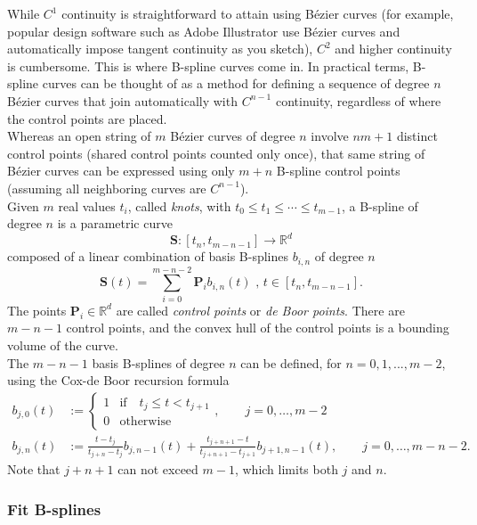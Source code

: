 \documentclass[]{usiinfbachelorproject}
\begin{document}
\noindent While $C^1$ continuity is straightforward to attain using B\'ezier curves (for example, popular design software such as Adobe Illustrator use B\'ezier curves and automatically impose tangent continuity as you sketch), $C^2$ and higher continuity is cumbersome. This is where B-spline curves come in. In practical terms, B-spline curves can be thought of as a method for defining a sequence of degree $n$ B\'ezier curves that join automatically with $C^{n-1}$ continuity, regardless of where the control points are placed.\\
Whereas an open string of $m$ B\'ezier curves of degree $n$ involve $nm + 1$ distinct control points (shared control points counted only once), that same string of B\'ezier curves can be expressed using only $m + n$ B-spline control points (assuming all neighboring curves are $C^{n-1}$).\\
Given $m$ real values  $t_i$, called \emph{knots}, with $t_0 \le t_1 \le \cdots \le t_{m-1} $, a B-spline of degree $n$ is a parametric curve
$$\mathbf{S}:[t_{n}, t_{m-n-1}] \to \mathbb{R}^d$$
composed of a linear combination of basis B-splines $b_{i,n}$ of degree $n$ 
$$\mathbf{S}(t)= \sum_{i=0}^{m-n-2} \mathbf{P}_{i} b_{i,n}(t) \mbox{ , } t \in [t_{n},t_{m-n-1}].$$
The points $\mathbf{P}_{i} \in \mathbb{R}^d$ are called \emph{control points} or \emph{de Boor points}. There are $m-n-1$ control points, and the convex hull of the control points is a bounding volume of the curve.\\
The $m-n-1$ basis B-splines of degree $n$ can be defined, for $n=0,1,...,m-2$, using the Cox-de Boor recursion formula 
\begin{align*}
	b_{j,0}(t) &:= \left\{
	\begin{matrix} 
		1 & \mathrm{if} \quad t_j \leq t < t_{j+1} \\
		0 & \mathrm{otherwise} 
	\end{matrix}
	\right.,\qquad j=0,\ldots, m{-}2
	\\
	b_{j,n}(t) &:= \frac{t - t_j}{t_{j+n} - t_j} b_{j,n-1}(t) + \frac{t_{j+n+1} - t}{t_{j+n+1} - t_{j+1}} b_{j+1,n-1}(t),\qquad j=0,\ldots, m{-}n{-}2.
\end{align*}
Note that $j+n+1$ can not exceed $m-1$, which limits both $j$ and $n$.

\subsubsection{Fit B-splines} \label{sec:fitsplines}
\end{document}
